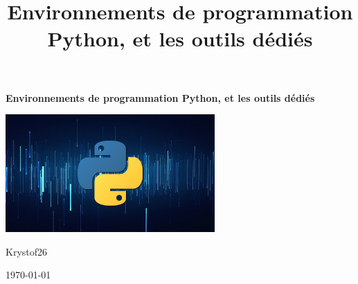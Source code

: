 \documentclass[a4paper,12pt]{book}
\title{Environnements de programmation Python, et les outils dédiés}
\begin{document}
\begin{titlepage}
    \begin{center}
        \vspace*{1cm}

        \begin{mdframed}[
            backgroundcolor=gray!35,
            linewidth=1.5pt,
            roundcorner=6pt,
        ]
            \centering
            \vspace*{1cm}

            \textbf{\Huge {}\selectfont Environnements de programmation Python, et les outils dédiés}

            \vspace*{2cm}

            \includegraphics[width=0.6\textwidth]{IMG/python-logo.png} %

            \vspace*{8cm}

            \Large Krystof26

            \vspace*{0.5cm}

            \Large \today

            \vspace*{1cm}
        \end{mdframed}

    \end{center}
\end{titlepage}



\tableofcontents






\end{document}
